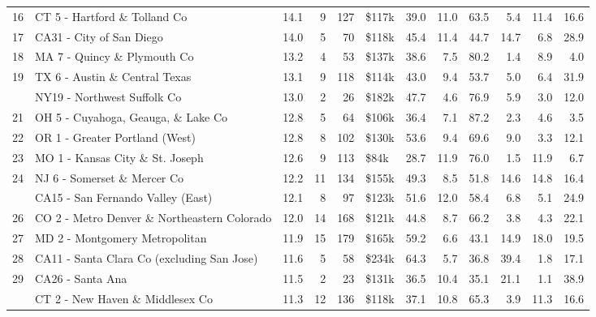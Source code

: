 \begin{table}
\begin{tabular}[t]{llrrrlrrrrrr}
16 & CT 5 - Hartford \& Tolland Co & 14.1 & 9 & 127 & \$117k & 39.0 & 11.0 & 63.5 & 5.4 & 11.4 & 16.6\\
17 & CA31 - City of San Diego & 14.0 & 5 & 70 & \$118k & 45.4 & 11.4 & 44.7 & 14.7 & 6.8 & 28.9\\
18 & MA 7 - Quincy \& Plymouth Co & 13.2 & 4 & 53 & \$137k & 38.6 & 7.5 & 80.2 & 1.4 & 8.9 & 4.0\\
19 & TX 6 - Austin \& Central Texas & 13.1 & 9 & 118 & \$114k & 43.0 & 9.4 & 53.7 & 5.0 & 6.4 & 31.9\\
\addlinespace
20 & NY19 - Northwest Suffolk Co & 13.0 & 2 & 26 & \$182k & 47.7 & 4.6 & 76.9 & 5.9 & 3.0 & 12.0\\
21 & OH 5 - Cuyahoga, Geauga, \& Lake Co & 12.8 & 5 & 64 & \$106k & 36.4 & 7.1 & 87.2 & 2.3 & 4.6 & 3.5\\
22 & OR 1 - Greater Portland (West) & 12.8 & 8 & 102 & \$130k & 53.6 & 9.4 & 69.6 & 9.0 & 3.3 & 12.1\\
23 & MO 1 - Kansas City \& St. Joseph & 12.6 & 9 & 113 & \$84k & 28.7 & 11.9 & 76.0 & 1.5 & 11.9 & 6.7\\
24 & NJ 6 - Somerset \& Mercer Co & 12.2 & 11 & 134 & \$155k & 49.3 & 8.5 & 51.8 & 14.6 & 14.8 & 16.4\\
\addlinespace
25 & CA15 - San Fernando Valley (East) & 12.1 & 8 & 97 & \$123k & 51.6 & 12.0 & 58.4 & 6.8 & 5.1 & 24.9\\
26 & CO 2 - Metro Denver \& Northeastern Colorado & 12.0 & 14 & 168 & \$121k & 44.8 & 8.7 & 66.2 & 3.8 & 4.3 & 22.1\\
27 & MD 2 - Montgomery Metropolitan & 11.9 & 15 & 179 & \$165k & 59.2 & 6.6 & 43.1 & 14.9 & 18.0 & 19.5\\
28 & CA11 - Santa Clara Co (excluding San Jose) & 11.6 & 5 & 58 & \$234k & 64.3 & 5.7 & 36.8 & 39.4 & 1.8 & 17.1\\
29 & CA26 - Santa Ana & 11.5 & 2 & 23 & \$131k & 36.5 & 10.4 & 35.1 & 21.1 & 1.1 & 38.9\\
\addlinespace
30 & CT 2 - New Haven \& Middlesex Co & 11.3 & 12 & 136 & \$118k & 37.1 & 10.8 & 65.3 & 3.9 & 11.3 & 16.6\\
\bottomrule
\end{tabular}
\end{table}
